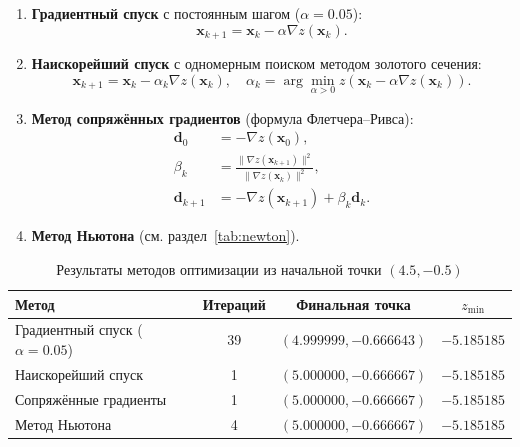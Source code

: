 \begin{enumerate}
    \item \textbf{Градиентный спуск} с постоянным шагом ($\alpha = 0.05$):
    \begin{equation}
        \mathbf{x}_{k+1} = \mathbf{x}_k - \alpha \nabla z(\mathbf{x}_k).
    \end{equation}

    \item \textbf{Наискорейший спуск} с одномерным поиском методом золотого сечения:
    \begin{equation}
        \mathbf{x}_{k+1} = \mathbf{x}_k - \alpha_k \nabla z(\mathbf{x}_k), \quad
        \alpha_k = \arg\min_{\alpha > 0} z(\mathbf{x}_k - \alpha \nabla z(\mathbf{x}_k)).
    \end{equation}

    \item \textbf{Метод сопряжённых градиентов} (формула Флетчера--Ривса):
    \begin{align}
        \mathbf{d}_0 &= -\nabla z(\mathbf{x}_0), \\
        \beta_k &= \frac{\|\nabla z(\mathbf{x}_{k+1})\|^2}{\|\nabla z(\mathbf{x}_k)\|^2}, \\
        \mathbf{d}_{k+1} &= -\nabla z(\mathbf{x}_{k+1}) + \beta_k \mathbf{d}_k.
    \end{align}

    \item \textbf{Метод Ньютона} (см. раздел~\ref{tab:newton}).
\end{enumerate}

\begin{table}[H]
    \centering
    \caption{Результаты методов оптимизации из начальной точки $(4.5, -0.5)$}
    \label{tab:methods}
    \begin{tabular}{|l|c|c|c|}
        \hline
        \textbf{Метод} & \textbf{Итераций} & \textbf{Финальная точка} & \textbf{$z_{\min}$} \\
        \hline
        Градиентный спуск ($\alpha = 0.05$) & 39 & $(4.999999, -0.666643)$ & $-5.185185$ \\
        Наискорейший спуск & 1 & $(5.000000, -0.666667)$ & $-5.185185$ \\
        Сопряжённые градиенты & 1 & $(5.000000, -0.666667)$ & $-5.185185$ \\
        Метод Ньютона & 4 & $(5.000000, -0.666667)$ & $-5.185185$ \\
        \hline
    \end{tabular}
\end{table}

